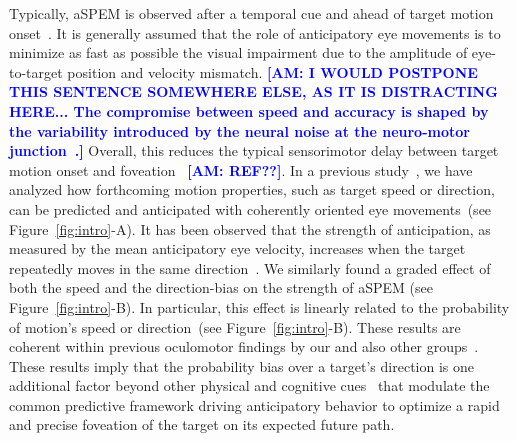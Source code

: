 \documentclass[12pt,english]{article}%
\newcommand{\citep}[1]{\parencite{#1}}
\newcommand{\seeFig}[1]{Figure~\ref{fig:#1}}
\newcommand{\AM}[1]{\textbf{\textcolor{blue}{[AM: #1]}}}
\begin{document}
Typically, aSPEM is observed after a temporal cue and
ahead of target motion onset~\citep{Kowler1979a,Kowler1979b, Kowler1984}. %
It is generally assumed that the role of anticipatory eye movements is
to minimize as fast as possible the visual impairment due
to the amplitude of eye-to-target position and velocity mismatch.
\AM{I WOULD POSTPONE THIS SENTENCE SOMEWHERE ELSE, AS IT IS DISTRACTING HERE... The compromise between speed and accuracy is shaped
by the variability introduced by the neural noise
at the neuro-motor junction~\citep{Harris98}.}
Overall, this reduces the typical sensorimotor delay
between target motion onset and foveation~ \AM{REF??}.
In a previous study~\citep{Montagnini2010},
we have analyzed how forthcoming motion properties,
such as target speed or direction, can be
predicted and anticipated with coherently oriented eye movements~(see \seeFig{intro}-A).
It has been observed that the strength of anticipation,
as measured by the mean anticipatory eye velocity, 
increases when the target repeatedly moves in the same direction~\citep{Kowler1984, Kowler1989, Heinen2005}.
We similarly found a graded effect of both the speed and the direction-bias
on the strength of aSPEM (see \seeFig{intro}-B).
In particular, this effect is linearly related 
to the probability of motion's speed or direction~(see \seeFig{intro}-B).
These results are coherent within previous oculomotor findings
by our and also other groups~\citep{SantosKowler2017}.
These results imply that the probability bias over a target's direction is
one additional factor beyond other physical and cognitive cues~\citep{Kowler2014, SantosKowler2017,Damasse18}
that modulate the common predictive framework
driving anticipatory behavior to optimize a rapid and
precise foveation of the target on its expected future path.
\end{document}
